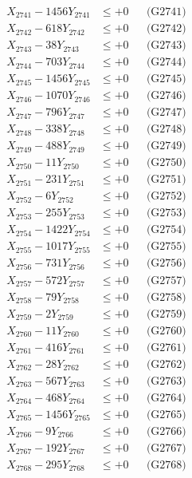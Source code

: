 \documentclass[a4paper,10pt]{article}
\begin{document}
{\begin{align}
\allowbreak
X_{2741} - 1456Y_{2741} &\leq +0 && \text{(G2741)} \\
X_{2742} - 618Y_{2742} &\leq +0 && \text{(G2742)} \\
X_{2743} - 38Y_{2743} &\leq +0 && \text{(G2743)} \\
X_{2744} - 703Y_{2744} &\leq +0 && \text{(G2744)} \\
X_{2745} - 1456Y_{2745} &\leq +0 && \text{(G2745)} \\
X_{2746} - 1070Y_{2746} &\leq +0 && \text{(G2746)} \\
X_{2747} - 796Y_{2747} &\leq +0 && \text{(G2747)} \\
X_{2748} - 338Y_{2748} &\leq +0 && \text{(G2748)} \\
X_{2749} - 488Y_{2749} &\leq +0 && \text{(G2749)} \\
X_{2750} - 11Y_{2750} &\leq +0 && \text{(G2750)} \\
\allowbreak
X_{2751} - 231Y_{2751} &\leq +0 && \text{(G2751)} \\
X_{2752} - 6Y_{2752} &\leq +0 && \text{(G2752)} \\
X_{2753} - 255Y_{2753} &\leq +0 && \text{(G2753)} \\
X_{2754} - 1422Y_{2754} &\leq +0 && \text{(G2754)} \\
X_{2755} - 1017Y_{2755} &\leq +0 && \text{(G2755)} \\
X_{2756} - 731Y_{2756} &\leq +0 && \text{(G2756)} \\
X_{2757} - 572Y_{2757} &\leq +0 && \text{(G2757)} \\
X_{2758} - 79Y_{2758} &\leq +0 && \text{(G2758)} \\
X_{2759} - 2Y_{2759} &\leq +0 && \text{(G2759)} \\
X_{2760} - 11Y_{2760} &\leq +0 && \text{(G2760)} \\
\allowbreak
X_{2761} - 416Y_{2761} &\leq +0 && \text{(G2761)} \\
X_{2762} - 28Y_{2762} &\leq +0 && \text{(G2762)} \\
X_{2763} - 567Y_{2763} &\leq +0 && \text{(G2763)} \\
X_{2764} - 468Y_{2764} &\leq +0 && \text{(G2764)} \\
X_{2765} - 1456Y_{2765} &\leq +0 && \text{(G2765)} \\
X_{2766} - 9Y_{2766} &\leq +0 && \text{(G2766)} \\
X_{2767} - 192Y_{2767} &\leq +0 && \text{(G2767)} \\
X_{2768} - 295Y_{2768} &\leq +0 && \text{(G2768)} \\

\end{align}}
\end{document}
